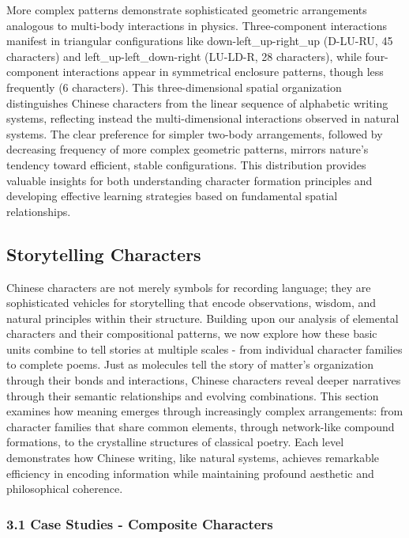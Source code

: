 More complex patterns demonstrate sophisticated geometric arrangements
analogous to multi-body interactions in physics. Three-component
interactions manifest in triangular configurations like
down-left\_up-right\_up (D-LU-RU, 45 characters) and
left\_up-left\_down-right (LU-LD-R, 28 characters), while four-component
interactions appear in symmetrical enclosure patterns, though less
frequently (6 characters). This three-dimensional spatial organization
distinguishes Chinese characters from the linear sequence of alphabetic
writing systems, reflecting instead the multi-dimensional interactions
observed in natural systems. The clear preference for simpler two-body
arrangements, followed by decreasing frequency of more complex geometric
patterns, mirrors nature's tendency toward efficient, stable
configurations. This distribution provides valuable insights for both
understanding character formation principles and developing effective
learning strategies based on fundamental spatial relationships.

\hypertarget{storytelling-characters}{%
\subsection{Storytelling Characters}\label{storytelling-characters}}

Chinese characters are not merely symbols for recording language; they
are sophisticated vehicles for storytelling that encode observations,
wisdom, and natural principles within their structure. Building upon our
analysis of elemental characters and their compositional patterns, we
now explore how these basic units combine to tell stories at multiple
scales - from individual character families to complete poems. Just as
molecules tell the story of matter's organization through their bonds
and interactions, Chinese characters reveal deeper narratives through
their semantic relationships and evolving combinations. This section
examines how meaning emerges through increasingly complex arrangements:
from character families that share common elements, through network-like
compound formations, to the crystalline structures of classical poetry.
Each level demonstrates how Chinese writing, like natural systems,
achieves remarkable efficiency in encoding information while maintaining
profound aesthetic and philosophical coherence.

\hypertarget{case-studies---composite-characters}{%
\subsubsection{3.1 Case Studies - Composite
Characters}\label{case-studies---composite-characters}}

